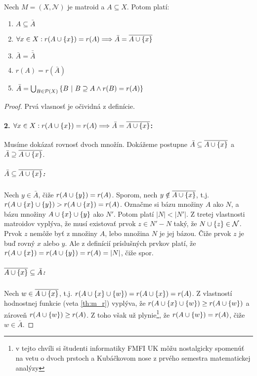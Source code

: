 \begin{theorem}
Nech $M = (X, \mathcal{N})$ je matroid a $A \subseteq X$. Potom platí:
\begin{enumerate}
    \item $A \subseteq \bar{A}$
    \item $\forall x \in X: r(A \cup \left\{x\right\}) = r(A) \Longrightarrow \bar{A} = \overline{A \cup \left\{x\right\}}$
    \item $\bar{A} = \bar{\bar{A}}$
    \item $r(A) = r(\bar{A})$
    \item $\bar{A} = \bigcup_{B \in \mathcal{P}(X)} \left\{B ~|~ B \supseteq A \wedge r(B) = r(A)\right\}$
\end{enumerate}
\end{theorem}
\begin{toreview}
\begin{proof}
Prvá vlasnosť je očividná z definície.
\paragraph{2. $\forall x \in X: r(A \cup \left\{x\right\}) = r(A) \Longrightarrow \bar{A} = \overline{A \cup \left\{x\right\}}$:}
Musíme dokázať rovnosť dvoch množín.
Dokážeme postupne $\bar{A} \subseteq \overline{A \cup \left\{x\right\}}$ a $\bar{A} \supseteq \overline{A \cup \left\{x\right\}}$.
\subparagraph{$\bar{A} \subseteq \overline{A \cup \left\{x\right\}}$:} 
Nech $y \in \bar{A}$, čiže $r(A \cup \left\{y\right\}) = r(A)$.
Sporom, nech $y \notin \overline{A \cup \left\{x\right\}}$, t.j. $r(A \cup \left\{x\right\} \cup \left\{y\right\}) > r(A \cup \left\{x\right\}) = r(A)$.
Označme si bázu množiny $A$ ako $N$, a bázu množiny $A \cup \left\{x\right\} \cup \left\{y\right\}$ ako $N'$.
Potom platí $|N| < |N'|$.
Z tretej vlastnosti matroidov vyplýva, že musí existovať prvok $z \in N' - N$ taký, že $N \cup \left\{z\right\} \in \mathcal{N}$.
Prvok $z$ nemôže byť z množiny $A$, lebo množina $N$ je jej bázou.
Čiže prvok $z$ je buď rovný $x$ alebo $y$.
Ale z definícií príslušných prvkov platí, že $r(A \cup \left\{x\right\}) = r(A \cup \left\{y\right\}) = r(A) = |N|$, čiže spor.
\subparagraph{$\overline{A \cup \left\{x\right\}}\subseteq \bar{A} $:} Nech $w \in \overline{A \cup \left\{x\right\}}$, t.j. $r(A \cup \left\{x\right\} \cup \left\{w\right\}) = r(A \cup \left\{x\right\}) = r(A)$.
Z vlastností hodnostnej funkcie (veta \ref{th:m_r}) vyplýva, že $r(A \cup \left\{x\right\} \cup \left\{w\right\}) \geq r(A \cup\left\{w\right\})$ a zároveň $r(A \cup\left\{w\right\}) \geq r(A)$.
Z toho však už plynie\footnote{v tejto chvíli si študenti informatiky FMFI UK môžu nostalgicky spomenúť na vetu o dvoch prstoch a Kubáčkovom nose z prvého semestra matematickej analýzy}, že $r(A \cup \left\{w\right\}) = r(A)$, čiže $w \in \bar{A}$.

\end{proof}
\end{toreview}
